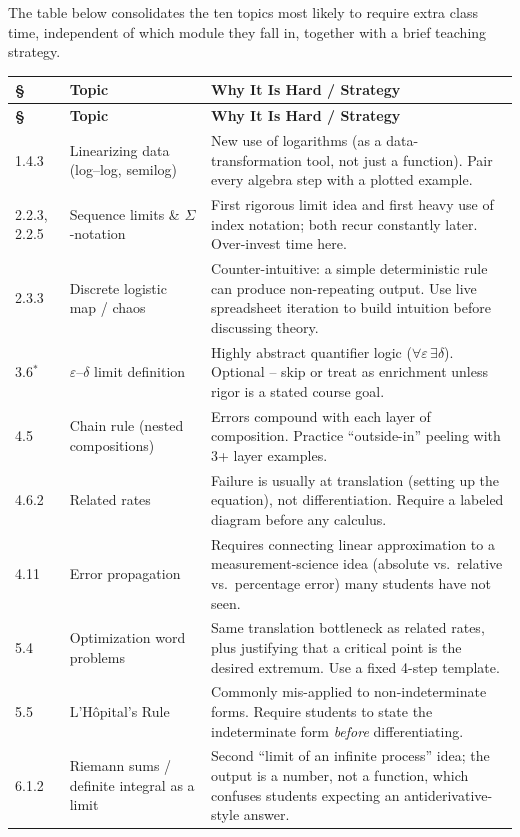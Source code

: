 \documentclass[11pt]{article}
\newcommand{\opt}{$^{\ast}$}
\begin{document}
The table below consolidates the ten topics most likely to require extra class time,
independent of which module they fall in, together with a brief teaching strategy.

\begin{longtable}{P{1.4cm}P{4.3cm}P{9.4cm}}
\toprule
\textbf{\S} & \textbf{Topic} & \textbf{Why It Is Hard / Strategy} \\
\midrule
\endfirsthead
\toprule
\textbf{\S} & \textbf{Topic} & \textbf{Why It Is Hard / Strategy} \\
\midrule
{}.3 & Linearizing data (log--log, semilog) & New use of logarithms (as a data-transformation tool, not just a function). Pair every algebra step with a plotted example. \\
2.2.3, 2.2.5 & Sequence limits \& $\Sigma$-notation & First rigorous limit idea and first heavy use of index notation; both recur constantly later. Over-invest time here. \\
2.3.3 & Discrete logistic map / chaos & Counter-intuitive: a simple deterministic rule can produce non-repeating output. Use live spreadsheet iteration to build intuition before discussing theory. \\
3.6\opt & $\varepsilon$--$\delta$ limit definition & Highly abstract quantifier logic ($\forall \varepsilon\, \exists \delta$). Optional -- skip or treat as enrichment unless rigor is a stated course goal. \\
4.5 & Chain rule (nested compositions) & Errors compound with each layer of composition. Practice ``outside-in'' peeling with 3+ layer examples. \\
4.6.2 & Related rates & Failure is usually at translation (setting up the equation), not differentiation. Require a labeled diagram before any calculus. \\
4.11 & Error propagation & Requires connecting linear approximation to a measurement-science idea (absolute vs.\ relative vs.\ percentage error) many students have not seen. \\
5.4 & Optimization word problems & Same translation bottleneck as related rates, plus justifying that a critical point is the desired extremum. Use a fixed 4-step template. \\
5.5 & L'H\^{o}pital's Rule & Commonly mis-applied to non-indeterminate forms. Require students to state the indeterminate form \emph{before} differentiating. \\
6.1.2 & Riemann sums / definite integral as a limit & Second ``limit of an infinite process'' idea; the output is a number, not a function, which confuses students expecting an antiderivative-style answer. \\
\bottomrule
\end{longtable}
\end{document}
